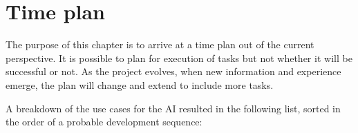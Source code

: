 


\chapter{Time plan}

The purpose of this chapter is to arrive at a time plan out of the current perspective. It is possible to plan for execution of tasks but not whether it will be successful or not. As the project evolves, when new information and experience emerge, the plan will change and extend to include more tasks. 

A breakdown of the use cases for the AI resulted in the following list, sorted in the order of a probable development sequence:

  
